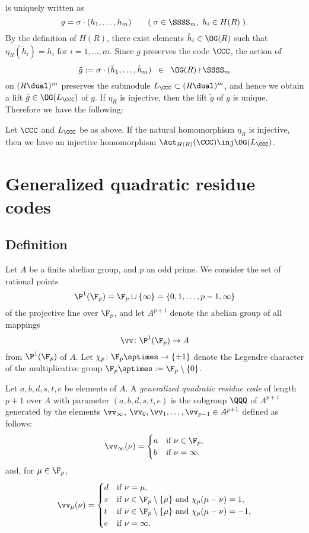 \documentclass{amsart}
\begin{document}
is uniquely written as
$$
g=\sigma \cdot (h_1, \dots, h_m)\qquad (\;\sigma\in \SSSS_m, \;h_i\in H(R)\;).
$$
By the definition of $H(R)$,
there exist elements $\tilde{h}_i\in \OG(R)$
such that $\eta_R(\tilde{h}_i)=h_i$
for $i=1, \dots, m$.
Since $g$ preserves the code $\CCC$,
the action of
$$
\tilde{g}:=\sigma \cdot  (\tilde{h}_1, \dots, \tilde{h}_m)\;\;\in\;\;  \OG(R)\wr \SSSS_m
$$
on $(R\dual)^m$ preserves the submodule $L_{\CCC}\subset (R\dual)^m$,
and hence we obtain a lift  $\tilde{g}\in \OG(L_{\CCC})$
of $g$.
If $\eta_R$ is injective,
then the lift $\tilde{g}$ of $g$ is unique.
Therefore  we have the following:
%
\begin{lemma}\label{lem:AutcodetoOL}
Let $\CCC$ and  $L_{\CCC}$ be as above.
If the natural homomorphism $\eta_R$ is injective,
then 
we have an injective  homomorphism
$\Aut_{H(R)}(\CCC)\inj \OG(L_{\CCC})$.
\end{lemma}
%
%
\section{Generalized quadratic residue codes}\label{sec:GQRC}
%
\subsection{Definition}\label{subsec:defGQRC}
%
Let $A$ be a finite abelian group, and 
$p$ an odd prime.
We consider the set of rational points 
$$
\P^1(\F_p)=\F_p\cup\{\infty\}=\{0,1,\dots, p-1, \infty\}
$$
of the projective line over $\F_p$,
and let $A^{p+1}$ denote the abelian group  of all mappings 
$$
\vv\colon \P^1(\F_p)\to A
$$
from $\P^1(\F_p)$ of $A$.
Let $\chi_p\colon \F_p\sptimes\to  \{\pm 1\}$
denote the Legendre character of the multiplicative group $\F_{p}\sptimes:=\F_p\setminus\{0\}$.
%
\begin{definition}
Let $a,b,d,s,t,e$ be elements of $A$.
A  \emph{generalized quadratic residue code} of length $p+1$ over $A$ with parameter $(a,b,d,s,t, e)$
is the subgroup  $\QQQ$ of $A^{p+1}$ generated by the  elements
$\vv_{\infty}$, $\vv_{0}, \vv_{1}, \dots,  \vv_{p-1} \in A^{p+1}$ defined as follows:
$$
\vv_{\infty}(\nu)=\begin{cases}
a & \textrm{if $\nu \in \F_p$}, \\
b & \textrm{if $\nu=\infty$}, 
\end{cases}
$$
and, for $\mu\in \F_p$, 
$$
\vv_{\mu}(\nu)=\begin{cases}
d & \textrm{if $\nu=\mu$}, \\
s & \textrm{if $\nu\in \F_p\setminus \{\mu\}$ and  $\chi_p(\mu-\nu)=1$}, \\
t & \textrm{if $\nu\in \F_p\setminus \{\mu\}$ and  $\chi_p(\mu-\nu)=-1$}, \\
e & \textrm{if $\nu=\infty$}.
\end{cases}
$$
\end{definition}
%
\end{document}
